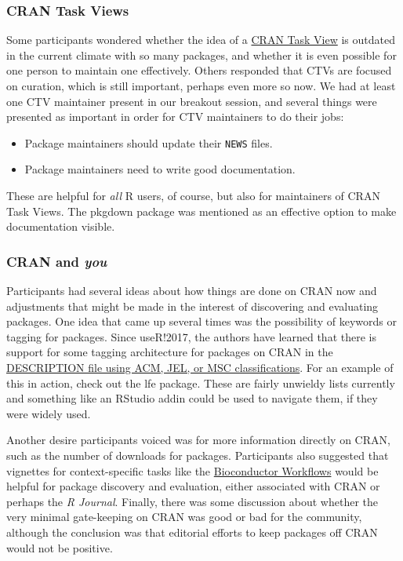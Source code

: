 \hypertarget{cran-task-views}{%
\subsubsection{CRAN Task Views}\label{cran-task-views}}

Some participants wondered whether the idea of a
\href{https://cran.r-project.org/web/views/}{CRAN Task View} is outdated
in the current climate with so many packages, and whether it is even
possible for one person to maintain one effectively. Others responded
that CTVs are focused on curation, which is still important, perhaps
even more so now. We had at least one CTV maintainer present in our
breakout session, and several things were presented as important in
order for CTV maintainers to do their jobs:

\begin{itemize}
\tightlist
\item
  Package maintainers should update their \texttt{NEWS} files.
\item
  Package maintainers need to write good documentation.
\end{itemize}

These are helpful for \emph{all} R users, of course, but also for
maintainers of CRAN Task Views. The pkgdown \citep{pkgdown} package was
mentioned as an effective option to make documentation visible.

\hypertarget{cran-and-you}{%
\subsubsection{\texorpdfstring{CRAN and
\emph{you}}{CRAN and you}}\label{cran-and-you}}

Participants had several ideas about how things are done on CRAN now and
adjustments that might be made in the interest of discovering and
evaluating packages. One idea that came up several times was the
possibility of keywords or tagging for packages. Since useR!2017, the
authors have learned that there is support for some tagging architecture
for packages on CRAN in the
\href{https://cran.r-project.org/doc/manuals/r-release/R-exts.html\#The-DESCRIPTION-file}{DESCRIPTION
file using ACM, JEL, or MSC classifications}. For an example of this in
action, check out the lfe \citep{lfe} package. These are fairly unwieldy
lists currently and something like an RStudio addin could be used to
navigate them, if they were widely used.

Another desire participants voiced was for more information directly on
CRAN, such as the number of downloads for packages. Participants also
suggested that vignettes for context-specific tasks like the
\href{https://www.bioconductor.org/help/workflows/}{Bioconductor
Workflows} would be helpful for package discovery and evaluation, either
associated with CRAN or perhaps the \emph{R Journal}. Finally, there was
some discussion about whether the very minimal gate-keeping on CRAN was
good or bad for the community, although the conclusion was that
editorial efforts to keep packages off CRAN would not be positive.

